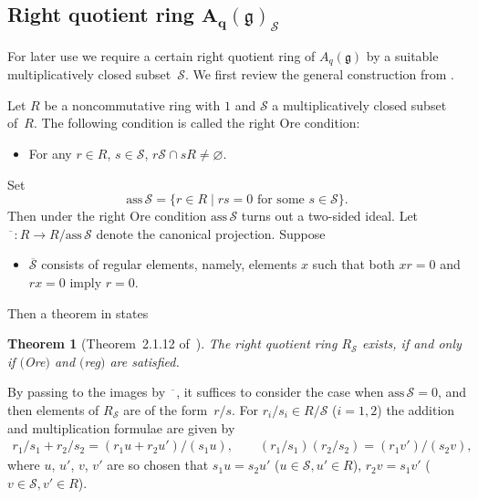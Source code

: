 \documentclass[11pt]{article}
\newtheorem{theorem}{Theorem}
\newcommand{\geh}{\mathfrak{g}}
\begin{document}
\subsection[Right quotient ring $A_q(\geh)_\mathcal{S}$]{Right quotient ring $\boldsymbol{A_q(\geh)_\mathcal{S}}$}

For later use we require a certain right quotient ring of $A_q(\geh)$ by a suitable multiplicatively
closed subset~$\mathcal{S}$. We f\/irst review the general construction from \cite[Chapter~2]{McCoRob}.

Let $R$ be a noncommutative ring with $1$ and $\mathcal{S}$ a multiplicatively closed subset of~$R$.
The following condition is called the right Ore condition:
\begin{itemize}\itemsep=0pt
\item[(Ore)] For any $r\in R$, $s\in\mathcal{S}$, $r\mathcal{S}\cap sR\neq\varnothing$.
\end{itemize}
Set
\[
\mathrm{ass}\,\mathcal{S}=\{r\in R\mid rs=0\mbox{ for some }s\in\mathcal{S}\}.
\]
Then under the right Ore condition $\mathrm{ass}\,\mathcal{S}$ turns out a two-sided ideal.
Let $\overline{\phantom{a}}:R\rightarrow R/\mathrm{ass}\,\mathcal{S}$ denote the canonical projection.
Suppose
\begin{itemize}\itemsep=0pt
\item[(reg)] $\overline{\mathcal{S}}$ consists of regular elements, namely, elements $x$ such that
both $xr=0$ and $rx=0$ imply $r=0$.
\end{itemize}
Then a theorem in \cite[Chapter~2]{McCoRob} states

\begin{theorem}[Theorem~2.1.12 of~\cite{McCoRob}] \label{th:McCoRob}
The right quotient ring $R_\mathcal{S}$ exists, if and only if $($Ore$)$ and $($reg$)$ are satisfied.
\end{theorem}

By passing to the images by $\overline{\phantom{a}}$, it suf\/f\/ices to consider the case when
$\mathrm{ass}\,\mathcal{S}=0$, and then elements of $R_\mathcal{S}$ are of the form~$r/s$.
For $r_i/s_i\in R/\mathcal{S}$ ($i=1,2$) the addition and multiplication formulae are given by
\begin{gather}\label{add-mult}
r_1/s_1+r_2/s_2=(r_1u+r_2u')/(s_1u),\qquad (r_1/s_1)(r_2/s_2)=(r_1v')/(s_2v),
\end{gather}
where $u$, $u'$, $v$, $v'$ are so chosen that $s_1u=s_2u'$ ($u\in\mathcal{S},u'\in R$), $r_2v=s_1v'$
($v\in\mathcal{S},v'\in R$).
\end{document}
